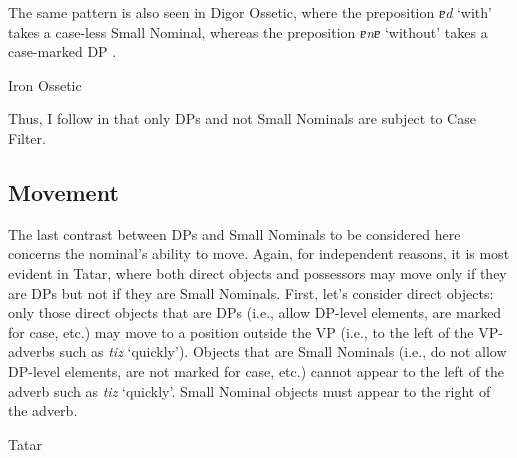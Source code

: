 \documentclass[output=paper]{langsci/langscibook}
\begin{document}
The same pattern is also seen in Digor Ossetic, where the preposition \textit{ɐd} ‘with’ takes a case-less Small Nominal, 
whereas the preposition \textit{ɐnɐ} ‘without’ takes a case-marked DP \citep{Erschler2019a}. 

\ea%
    \label{pereex:key:16}
    Iron Ossetic 
    \z
\z 
         
Thus, I follow \citet{Danon2006} in that only DPs and not Small Nominals are subject to Case Filter.

\subsection{Movement}  %

The last contrast between DPs and Small Nominals to be considered here concerns the nominal’s ability to move. Again, for independent reasons, it is most evident in Tatar, where both direct objects and possessors may move only if they are DPs but not if they are Small Nominals. First, let’s consider direct objects: only those direct objects that are DPs (i.e., allow DP-level elements, are marked for case, etc.) may move to a position outside the VP (i.e., to the left of the VP-adverbs such as \textit{tiz} ‘quickly’). Objects that are Small Nominals (i.e., do not allow DP-level elements, are not marked for case, etc.) cannot appear to the left of the adverb such as \textit{tiz} ‘quickly’. Small Nominal objects must appear to the right of the adverb.

\ea%
    \label{pereex:key:17}
    Tatar 
    \z 
\z 
\end{document}
